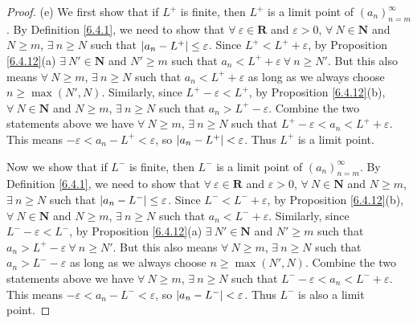 \begin{proof}{(e)}
We first show that if \(L^+\) is finite, then \(L^+\) is a limit point of \((a_n)_{n = m}^\infty\).
By Definition \ref{6.4.1}, we need to show that \(\forall\ \varepsilon \in \mathbf{R}\) and \(\varepsilon > 0\), \(\forall\ N \in \mathbf{N}\) and \(N \geq m\), \(\exists\ n \geq N\) such that \(\abs*{a_n - L^+} \leq \varepsilon\).
Since \(L^+ < L^+ + \varepsilon\), by Proposition \ref{6.4.12}(a) \(\exists\ N' \in \mathbf{N}\) and \(N' \geq m\) such that \(a_n < L^+ + \varepsilon \ \forall\ n \geq N'\).
But this also means \(\forall\ N \geq m\), \(\exists\ n \geq N\) such that \(a_n < L^+ + \varepsilon\) as long as we always choose \(n \geq \max(N', N)\).
Similarly, since \(L^+ - \varepsilon < L^+\), by Proposition \ref{6.4.12}(b), \(\forall\ N \in \mathbf{N}\) and \(N \geq m\), \(\exists\ n \geq N\) such that \(a_n > L^+ - \varepsilon\).
Combine the two statements above we have \(\forall\ N \geq m\), \(\exists\ n \geq N\) such that \(L^+ - \varepsilon < a_n < L^+ + \varepsilon\).
This means \(-\varepsilon < a_n - L^+ < \varepsilon\), so \(\abs*{a_n - L^+} < \varepsilon\).
Thus \(L^+\) is a limit point.

Now we show that if \(L^-\) is finite, then \(L^-\) is a limit point of \((a_n)_{n = m}^\infty\).
By Definition \ref{6.4.1}, we need to show that \(\forall\ \varepsilon \in \mathbf{R}\) and \(\varepsilon > 0\), \(\forall\ N \in \mathbf{N}\) and \(N \geq m\), \(\exists\ n \geq N\) such that \(\abs*{a_n - L^-} \leq \varepsilon\).
Since \(L^- < L^- + \varepsilon\), by Proposition \ref{6.4.12}(b), \(\forall\ N \in \mathbf{N}\) and \(N \geq m\), \(\exists\ n \geq N\) such that \(a_n < L^- + \varepsilon\).
Similarly, since \(L^- - \varepsilon < L^-\), by Proposition \ref{6.4.12}(a) \(\exists\ N' \in \mathbf{N}\) and \(N' \geq m\) such that \(a_n > L^+ - \varepsilon \ \forall\ n \geq N'\).
But this also means \(\forall\ N \geq m\), \(\exists\ n \geq N\) such that \(a_n > L^- - \varepsilon\) as long as we always choose \(n \geq \max(N', N)\).
Combine the two statements above we have \(\forall\ N \geq m\), \(\exists\ n \geq N\) such that \(L^- - \varepsilon < a_n < L^- + \varepsilon\).
This means \(-\varepsilon < a_n - L^- < \varepsilon\), so \(\abs*{a_n - L^-} < \varepsilon\).
Thus \(L^-\) is also a limit point.
\end{proof}

